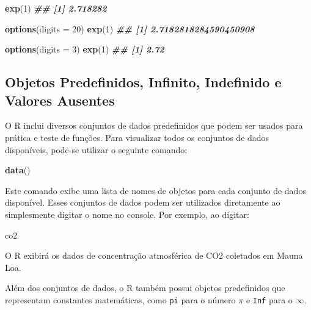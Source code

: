 \documentclass[
]{book}
\newenvironment{Shaded}{\begin{snugshade}}{\end{snugshade}}
\newcommand{\AttributeTok}[1]{\textcolor[rgb]{0.13,0.29,0.53}{#1}}
\newcommand{\DecValTok}[1]{\textcolor[rgb]{0.00,0.00,0.81}{#1}}
\newcommand{\DocumentationTok}[1]{\textcolor[rgb]{0.56,0.35,0.01}{\textbf{\textit{#1}}}}
\newcommand{\FunctionTok}[1]{\textcolor[rgb]{0.13,0.29,0.53}{\textbf{#1}}}
\newcommand{\NormalTok}[1]{#1}
\begin{document}
\begin{Shaded}
\begin{Highlighting}[]
\FunctionTok{exp}\NormalTok{(}\DecValTok{1}\NormalTok{)}
\DocumentationTok{\#\# [1] 2.718282}

\FunctionTok{options}\NormalTok{(}\AttributeTok{digits =} \DecValTok{20}\NormalTok{)}
\FunctionTok{exp}\NormalTok{(}\DecValTok{1}\NormalTok{)}
\DocumentationTok{\#\# [1] 2.7182818284590450908}

\FunctionTok{options}\NormalTok{(}\AttributeTok{digits =} \DecValTok{3}\NormalTok{)}
\FunctionTok{exp}\NormalTok{(}\DecValTok{1}\NormalTok{)}
\DocumentationTok{\#\# [1] 2.72}
\end{Highlighting}
\end{Shaded}

\subsection{Objetos Predefinidos, Infinito, Indefinido e Valores Ausentes}\label{objetos-predefinidos-infinito-indefinido-e-valores-ausentes}

O R inclui diversos conjuntos de dados predefinidos que podem ser usados
para prática e teste de funções. Para visualizar todos os conjuntos de
dados disponíveis, pode-se utilizar o seguinte comando:

\begin{Shaded}
\begin{Highlighting}[]
\FunctionTok{data}\NormalTok{()}
\end{Highlighting}
\end{Shaded}

Este comando exibe uma lista de nomes de objetos para cada conjunto de
dados disponível. Esses conjuntos de dados podem ser utilizados
diretamente ao simplesmente digitar o nome no console. Por exemplo, ao
digitar:

\begin{Shaded}
\begin{Highlighting}[]
\NormalTok{co2}
\end{Highlighting}
\end{Shaded}

O R exibirá os dados de concentração atmosférica de CO2 coletados em
Mauna Loa.

Além dos conjuntos de dados, o R também possui objetos predefinidos que
representam constantes matemáticas, como \texttt{pi} para o número \(\pi\) e
\texttt{Inf} para o \(\infty\).
\end{document}
